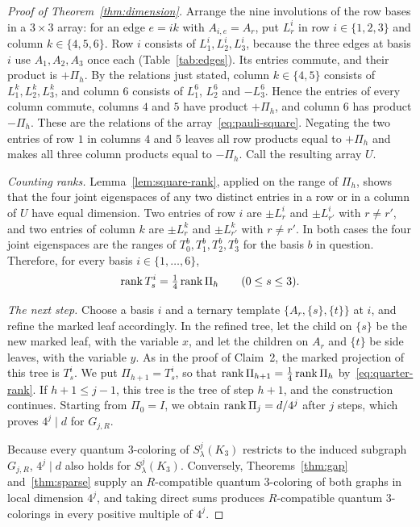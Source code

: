 \begin{proof}[Proof of Theorem~\ref{thm:dimension}]
Arrange the nine involutions of the row bases in a $3\times3$ array: for an edge $e=ik$ with $A_{i,e}=A_r$, put $L^i_r$ in row $i\in\{1,2,3\}$ and column $k\in\{4,5,6\}$. Row $i$ consists of $L^i_1,L^i_2,L^i_3$, because the three edges at basis $i$ use $A_1,A_2,A_3$ once each (Table~\ref{tab:edges}). Its entries commute, and their product is $+\Pi_h$. By the relations just stated, column $k\in\{4,5\}$ consists of $L^k_1,L^k_2,L^k_3$, and column $6$ consists of $L^6_1$, $L^6_2$ and $-L^6_3$. Hence the entries of every column commute, columns $4$ and $5$ have product $+\Pi_h$, and column $6$ has product $-\Pi_h$. These are the relations of the array~\eqref{eq:pauli-square}. Negating the two entries of row $1$ in columns $4$ and $5$ leaves all row products equal to $+\Pi_h$ and makes all three column products equal to $-\Pi_h$. Call the resulting array $U$.

\emph{Counting ranks.} Lemma~\ref{lem:square-rank}, applied on the range of $\Pi_h$, shows that the four joint eigenspaces of any two distinct entries in a row or in a column of $U$ have equal dimension. Two entries of row $i$ are $\pm L^i_r$ and $\pm L^i_{r'}$ with $r\ne r'$, and two entries of column $k$ are $\pm L^k_r$ and $\pm L^k_{r'}$ with $r\ne r'$. In both cases the four joint eigenspaces are the ranges of $T^b_0,T^b_1,T^b_2,T^b_3$ for the basis $b$ in question. Therefore, for every basis $i\in\{1,\ldots,6\}$,
\begin{equation}\label{eq:quarter-rank}
 \operatorname{rank} T^i_s=\tfrac14\operatorname{rank}\Pi_h\qquad (0\le s\le3).
\end{equation}

\emph{The next step.} Choose a basis $i$ and a ternary template $\{A_r,\{s\},\{t\}\}$ at $i$, and refine the marked leaf accordingly. In the refined tree, let the child on $\{s\}$ be the new marked leaf, with the variable $x$, and let the children on $A_r$ and $\{t\}$ be side leaves, with the variable $y$. As in the proof of Claim~2, the marked projection of this tree is $T^i_s$. We put $\Pi_{h+1}=T^i_s$, so that $\operatorname{rank}\Pi_{h+1}=\frac14\operatorname{rank}\Pi_h$ by~\eqref{eq:quarter-rank}. If $h+1\le j-1$, this tree is the tree of step $h+1$, and the construction continues. Starting from $\Pi_0=I$, we obtain $\operatorname{rank}\Pi_j=d/4^j$ after $j$ steps, which proves $4^j\mid d$ for $G_{j,R}$.

Because every quantum $3$-coloring of $S^j_\lambda(K_3)$ restricts to the induced subgraph $G_{j,R}$, $4^j\mid d$ also holds for $S^j_\lambda(K_3)$. Conversely, Theorems~\ref{thm:gap} and~\ref{thm:sparse} supply an $R$-compatible quantum $3$-coloring of both graphs in local dimension $4^j$, and taking direct sums produces $R$-compatible quantum $3$-colorings in every positive multiple of $4^j$.
\end{proof}

